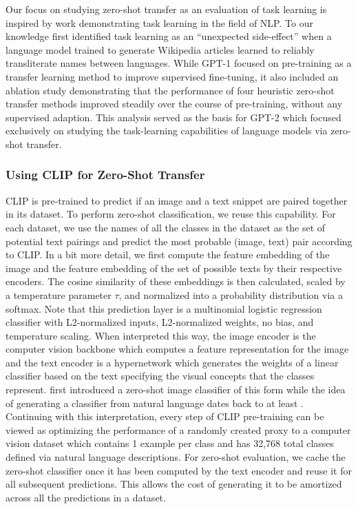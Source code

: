 \documentclass{article}
\begin{document}
Our focus on studying zero-shot transfer as an evaluation of task learning is inspired by work demonstrating task learning in the field of NLP. To our knowledge \citet{liu2018generating} first identified task learning as an ``unexpected side-effect'' when a language model trained to generate Wikipedia articles learned to reliably transliterate names between languages. While GPT-1 \citep{radford2018improving} focused on pre-training as a transfer learning method to improve supervised fine-tuning, it also included an ablation study demonstrating that the performance of four heuristic zero-shot transfer methods improved steadily over the course of pre-training, without any supervised adaption. This analysis served as the basis for GPT-2 \citep{radford2019language} which focused exclusively on studying the task-learning capabilities of language models via zero-shot transfer.



\subsubsection{Using CLIP for Zero-Shot Transfer}

CLIP is pre-trained to predict if an image and a text snippet are paired together in its dataset. To perform zero-shot classification, we reuse this capability. For each dataset, we use the names of all the classes in the dataset as the set of potential text pairings and predict the most probable (image, text) pair according to CLIP. In a bit more detail, we first compute the feature embedding of the image and the feature embedding of the set of possible texts by their respective encoders. The cosine similarity of these embeddings is then calculated, scaled by a temperature parameter $\tau$, and normalized into a probability distribution via a softmax. Note that this prediction layer is a multinomial logistic regression classifier with L2-normalized inputs, L2-normalized weights, no bias, and temperature scaling. When interpreted this way, the image encoder is the computer vision backbone which computes a feature representation for the image and the text encoder is a hypernetwork \citep{ha2016hypernetworks} which generates the weights of a linear classifier based on the text specifying the visual concepts that the classes represent. \citet{lei2015predicting} first introduced a zero-shot image classifier of this form while the idea of generating a classifier from natural language dates back to at least \citet{elhoseiny2013write}. Continuing with this interpretation, every step of CLIP pre-training can be viewed as optimizing the performance of a randomly created proxy to a computer vision dataset which contains 1 example per class and has 32,768 total classes defined via natural language descriptions. For zero-shot evaluation, we cache the zero-shot classifier once it has been computed by the text encoder and reuse it for all subsequent predictions. This allows the cost of generating it to be amortized across all the predictions in a dataset.
\end{document}
